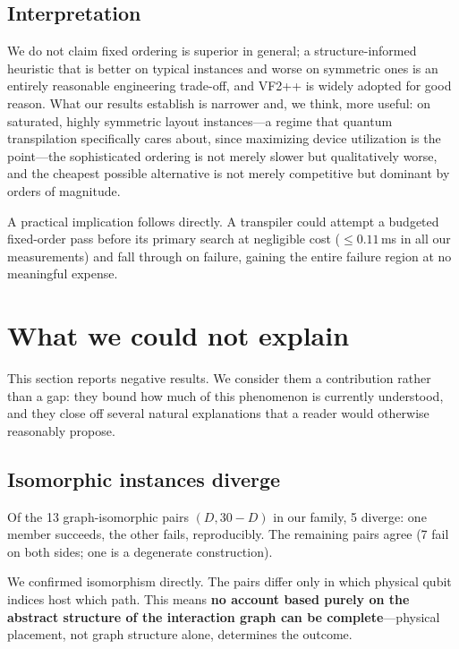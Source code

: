 \documentclass[11pt]{article}
\begin{document}
\subsection{Interpretation}

We do not claim fixed ordering is superior in general; a
structure-informed heuristic that is better on typical instances and
worse on symmetric ones is an entirely reasonable engineering
trade-off, and VF2++ is widely adopted for good reason. What our
results establish is narrower and, we think, more useful: on saturated,
highly symmetric layout instances---a regime that quantum transpilation
specifically cares about, since maximizing device utilization is the
point---the sophisticated ordering is not merely slower but
qualitatively worse, and the cheapest possible alternative is not
merely competitive but dominant by orders of magnitude.

A practical implication follows directly. A transpiler could attempt a
budgeted fixed-order pass before its primary search at negligible cost
($\leq 0.11$\,ms in all our measurements) and fall through on failure,
gaining the entire failure region at no meaningful expense.

\section{What we could not explain}
\label{sec:unexplained}

This section reports negative results. We consider them a contribution
rather than a gap: they bound how much of this phenomenon is currently
understood, and they close off several natural explanations that a
reader would otherwise reasonably propose.

\subsection{Isomorphic instances diverge}

Of the 13 graph-isomorphic pairs $(D, 30-D)$ in our family, 5 diverge:
one member succeeds, the other fails, reproducibly. The remaining pairs
agree (7 fail on both sides; one is a degenerate construction).

We confirmed isomorphism directly. The pairs differ only in which
physical qubit indices host which path. This means \textbf{no account
based purely on the abstract structure of the interaction graph can be
complete}---physical placement, not graph structure alone, determines
the outcome.
\end{document}
